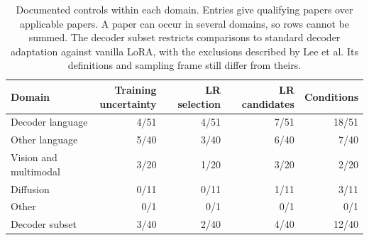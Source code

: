 \begin{table}[!htbp]
\captionsetup{labelsep=period}
\caption{Documented controls within each domain. Entries give qualifying papers over applicable papers. A paper can occur in several domains, so rows cannot be summed. The decoder subset restricts comparisons to standard decoder adaptation against vanilla LoRA, with the exclusions described by Lee et al. Its definitions and sampling frame still differ from theirs.}
\label{tab:peft-review-domains}
\centering
\begin{tabular*}{\linewidth}{@{\extracolsep{\fill}}lrrrr@{}}
\toprule
Domain & \shortstack{Training\\uncertainty} & LR selection & LR candidates & Conditions \\
\midrule
Decoder language & 4/51 & 4/51 & 7/51 & 18/51 \\
Other language & 5/40 & 3/40 & 6/40 & 7/40 \\
Vision and multimodal & 3/20 & 1/20 & 3/20 & 2/20 \\
Diffusion & 0/11 & 0/11 & 1/11 & 3/11 \\
Other & 0/1 & 0/1 & 0/1 & 0/1 \\
\midrule
Decoder subset & 3/40 & 2/40 & 4/40 & 12/40 \\
\bottomrule
\end{tabular*}
\end{table}
